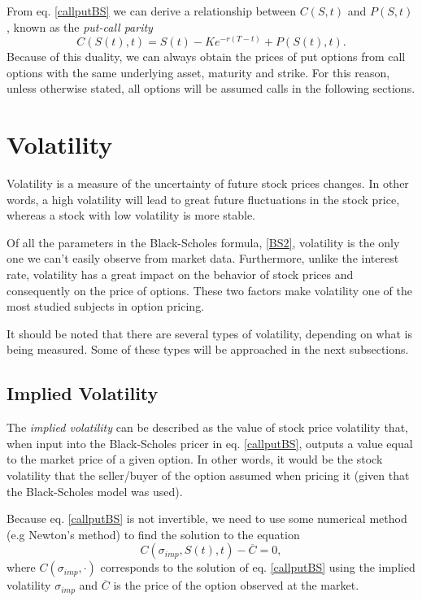 From eq. \eqref{callputBS} we can derive a relationship between $C(S,t)$ and $P(S,t)$, known as the \emph{put-call parity}
\begin{equation}
C(S(t),t)=S(t)-Ke^{-r(T-t)}+P(S(t),t).
\end{equation}
\noindent Because of this duality, we can always obtain the prices of put options from call options with the same underlying asset, maturity and strike. For this reason, unless otherwise stated, all options will be assumed calls in the following sections.


\section{Volatility}
\label{section:volatility}
Volatility is a measure of the uncertainty of future stock prices changes. In other words, a high volatility will lead to great future fluctuations in the stock price, whereas a stock with low volatility is more stable.

Of all the parameters in the Black-Scholes formula, \eqref{BS2}, volatility is the only one we can't easily observe from market data.
Furthermore, unlike the interest rate, volatility has a great impact on the behavior of stock prices and consequently on the price of options.
These two factors make volatility one of the most studied subjects in option pricing.



It should be noted that there are several types of volatility, depending on what is being measured. Some of these types will be approached in the next subsections.

\subsection{Implied Volatility}
\label{section:impliedvolatility}
The \emph{implied volatility} can be described as the value of stock price volatility that, when input into the Black-Scholes pricer in eq. \eqref{callputBS}, outputs a value equal to the market price of a given option.
In other words, it would be the stock volatility that the seller/buyer of the option assumed when pricing it (given that the Black-Scholes model was used).

Because eq. \eqref{callputBS} is not invertible, we need to use some numerical method (e.g Newton's method) to find the solution to the equation
\begin{equation}
C(\sigma_{imp},S(t),t)-\overline{C}=0,
\end{equation}
\noindent where $C(\sigma_{imp},\cdot)$ corresponds to the solution of eq. \eqref{callputBS} using the implied volatility $\sigma_{imp}$ and $\overline{C}$ is the price of the option observed at the market.


